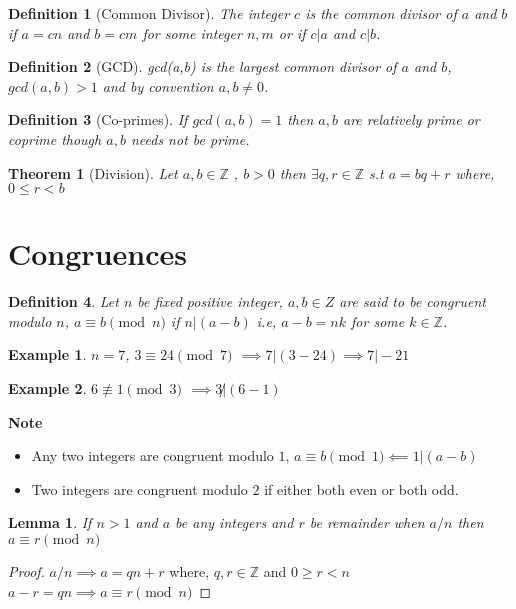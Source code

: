 \documentclass[12pt,a4paper]{article}
\newcommand{\Z}{\mathbb{Z}}
\newtheorem{thm}{Theorem}
\newtheorem{defn}{Definition}
\newtheorem{lem}{Lemma}
\newtheorem{ex}{Example}
\begin{document}
\begin{defn}[Common Divisor]
	The integer $c$ is the common divisor of $a$ and $b$ if $a=cn$ and $b=cm$ for some integer $n,m$ or if $c|a$ and $c|b$.
\end{defn}
\begin{defn}[GCD]
	gcd(a,b) is the largest common divisor of $a$ and $b$, $gcd(a,b)>1$ and by convention $a,b \ne 0$.
\end{defn}
\begin{defn}[Co-primes]
	If $gcd(a,b)=1$ then $a,b$ are relatively prime or coprime though $a,b$ needs not be prime.
\end{defn}

\begin{thm}[Division]
	Let $a,b \in \Z$ , $b>0$ then $\exists q,r \in \Z$ s.t $a=bq+r$ where, $0\le r < b$
\end{thm}
 
\section{Congruences}
\begin{defn}
	Let $n$ be fixed positive integer, $a,b \in Z$ are said to be congruent modulo $n$, $a \equiv b \pmod n$ if $n|(a-b)$ i.e, $a-b = nk$ for some $k \in \Z$.
\end{defn}
\begin{ex}
	$n=7$, $3 \equiv 24 \pmod 7$ $\implies 7|(3-24) \implies 7|-21$
\end{ex}
\begin{ex}
 $6 \not \equiv 1 \pmod 3$ $\implies 3 \not |(6-1) $
\end{ex}

\textbf{Note}
\begin{itemize}
	\item Any two integers are congruent modulo $1$, $a\equiv b \pmod 1 \impliedby 1|(a-b)$
	\item Two integers are congruent modulo $2$ if either both even or both odd.
\end{itemize}

\begin{lem}	
	If $n>1$ and $a$ be any integers and $r$ be remainder when $a/n$ then $a \equiv r \pmod n$
\end{lem}
\begin{proof}
	$a/n \implies a=qn+r$ where, $ q,r \in \Z $ and $0\ge r < n$ \\
	$a-r = qn \implies a \equiv r \pmod n$
\end{proof}
\end{document}
